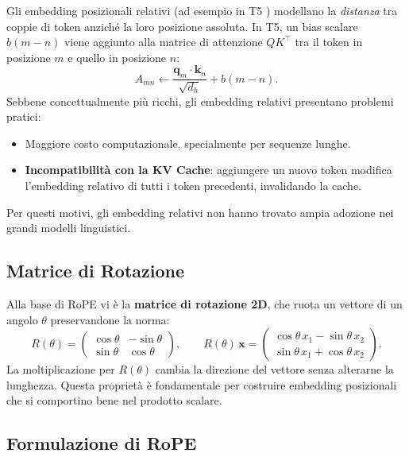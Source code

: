 Gli embedding posizionali relativi (ad esempio in T5 \citep{raffel2020t5})
modellano la \emph{distanza} tra coppie di token anziché la loro posizione
assoluta. In T5, un bias scalare $b(m-n)$ viene aggiunto alla matrice di
attenzione $Q K^\top$ tra il token in posizione $m$ e quello in posizione $n$:
\begin{equation}
  A_{mn} \leftarrow \frac{\mathbf{q}_m \cdot \mathbf{k}_n}{\sqrt{d_h}} + b(m-n).
\end{equation}
Sebbene concettualmente più ricchi, gli embedding relativi presentano
problemi pratici:
\begin{itemize}
  \item Maggiore costo computazionale, specialmente per sequenze lunghe.
  \item \textbf{Incompatibilità con la KV Cache}: aggiungere un nuovo token
        modifica l'embedding relativo di tutti i token precedenti,
        invalidando la cache.
\end{itemize}
Per questi motivi, gli embedding relativi non hanno trovato ampia adozione
nei grandi modelli linguistici.

\subsection{Matrice di Rotazione}
\label{subsec:rotation-matrix}

Alla base di RoPE vi è la \textbf{matrice di rotazione 2D}, che ruota un
vettore di un angolo $\theta$ preservandone la norma:
\begin{equation}
  R(\theta) = \begin{pmatrix} \cos\theta & -\sin\theta \\ \sin\theta & \cos\theta \end{pmatrix},
  \qquad
  R(\theta)\,\mathbf{x} = \begin{pmatrix} \cos\theta\, x_1 - \sin\theta\, x_2 \\
                                            \sin\theta\, x_1 + \cos\theta\, x_2 \end{pmatrix}.
  \label{eq:rotation-matrix}
\end{equation}
La moltiplicazione per $R(\theta)$ cambia la direzione del vettore senza
alterarne la lunghezza. Questa proprietà è fondamentale per costruire
embedding posizionali che si comportino bene nel prodotto scalare.

\subsection{Formulazione di RoPE}
\label{subsec:rope-formulation}


